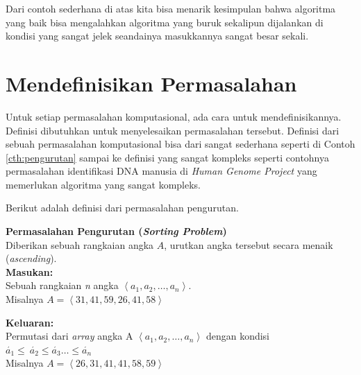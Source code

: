 Dari contoh sederhana di atas kita bisa menarik kesimpulan bahwa algoritma yang baik bisa mengalahkan algoritma yang buruk sekalipun dijalankan di kondisi yang sangat jelek seandainya masukkannya sangat besar sekali. 

\section{Mendefinisikan Permasalahan}
Untuk setiap permasalahan komputasional, ada cara untuk mendefinisikannya. Definisi dibutuhkan untuk menyelesaikan permasalahan tersebut. Definisi dari sebuah permasalahan komputasional bisa dari sangat sederhana seperti di Contoh \ref{cth:pengurutan} sampai ke definisi yang sangat kompleks seperti contohnya permasalahan identifikasi DNA manusia di \textit{Human Genome Project} yang memerlukan algoritma yang sangat kompleks.

Berikut adalah definisi dari permasalahan pengurutan.
\begin{contoh}
\label{cth:pengurutan}
\textbf{Permasalahan Pengurutan (\textit{Sorting Problem})}\\
Diberikan sebuah rangkaian angka $A$, urutkan angka tersebut secara menaik (\textit{ascending}).\\
\textbf{Masukan:}\\
Sebuah rangkaian \textit{n} angka $\left\langle a_{1},a_{2},\ldots,a_{n} \right\rangle$.\\
Misalnya $A = \left\langle 31,41,59,26,41,58 \right\rangle$

\textbf{Keluaran:}\\ 
Permutasi dari \textit{array} angka A $\left\langle a_{1},a_{2},\ldots,a_{n}\right\rangle$ dengan kondisi $\acute{a_{1}} \leq\ \acute{a_{2}} \leq \acute{a_{3}} \ldots \leq \acute{a_{n}}$ \\
Misalnya $A = \left\langle 26,31,41,41,58,59 \right\rangle$
\end{contoh}

